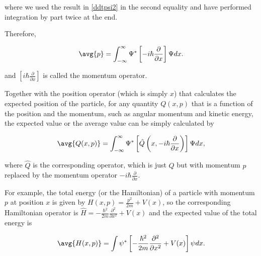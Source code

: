 \documentclass[a4paper,12pt]{report}
\begin{document}
where we used the result in \cref{ddtpsi2} in the second equality and have performed integration by part twice at the end.
	
Therefore,

\begin{equation}
  \avg{p} = \int_{-\infty}^{\infty} \Psi ^* \left[-i\hbar \frac{\partial }{\partial x} \right] \Psi dx.
\end{equation}

and \(\displaystyle \left[i\hbar \frac{\partial }{\partial x} \right]\) is called the momentum operator. 

Together with the position operator (which is simply \(x\)) that calculates the expected position of the particle, for any quantity \(Q(x,p)\) that is a function of the position and the momentum, such as angular momentum and kinetic energy, the expected value or the average value can be simply calculated by 
	
\begin{equation}
  \avg{Q(x,p)} = \int_{-\infty}^{\infty} \Psi ^* \left[\hat{Q} \left(x, -i\hbar \frac{\partial }{\partial x} \right)\right] \Psi dx, \label{expectedvalues} 
\end{equation}

where \(\hat{Q}\) is the corresponding operator, which is just \(Q\) but with momentum \(p\) replaced by the momentum operator \(\displaystyle -i \hbar \frac{\partial }{\partial x} \).   

For example, the total energy (or the Hamiltonian) of a particle with momentum \(p\) at position \(x\) is given by \(\displaystyle H(x,p) = \frac{p^2}{2m} + V(x) \), so the corresponding Hamiltonian operator is \(\displaystyle \hat{H} = - \frac{\hbar ^2}{2m}\frac{\partial^2 }{\partial x^2} +V(x)\) and the expected value of the total energy is 

\begin{equation}
  \avg{H(x,p)} = \int \psi ^* \left[ - \frac{\hbar ^2}{2m}\frac{\partial^2 }{\partial x^2} +V(x) \right]\psi dx. \label{Hamil} 
\end{equation}
\end{document}
